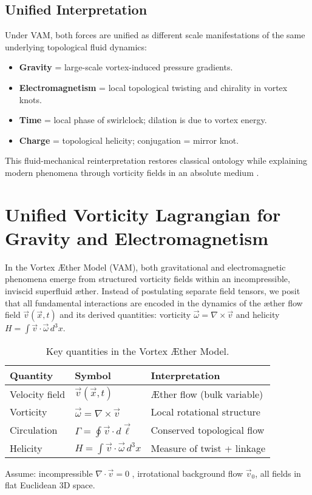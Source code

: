 \subsection{Unified Interpretation}

Under VAM, both forces are unified as different scale manifestations of the same underlying topological fluid dynamics:
\begin{itemize}
  \item \textbf{Gravity} = large-scale vortex-induced pressure gradients.
  \item \textbf{Electromagnetism} = local topological twisting and chirality in vortex knots.
  \item \textbf{Time} = local phase of swirlclock; dilation is due to vortex energy.
  \item \textbf{Charge} = topological helicity; conjugation = mirror knot.
\end{itemize}

This fluid-mechanical reinterpretation restores classical ontology while explaining modern phenomena through vorticity fields in an absolute medium \cite{Iskandarani2025SwirlClocks}.

\section{Unified Vorticity Lagrangian for Gravity and Electromagnetism}

In the Vortex \AE{}ther Model (VAM), both gravitational and electromagnetic phenomena emerge from structured vorticity fields within an incompressible, inviscid superfluid \ae{}ther. Instead of postulating separate field tensors, we posit that all fundamental interactions are encoded in the dynamics of the \ae{}ther flow field $\vec{v}(\vec{x}, t)$ and its derived quantities: vorticity $\vec{\omega} = \nabla \times \vec{v}$ and helicity $H = \int \vec{v} \cdot \vec{\omega} \, d^3x$.

\begin{table}[H]
\centering
\begin{tabular}{|l|l|l|}
\hline
\textbf{Quantity} & \textbf{Symbol} & \textbf{Interpretation} \\
\hline
Velocity field & $\vec{v}(\vec{x}, t)$ & Æther flow (bulk variable) \\
Vorticity & $\vec{\omega} = \nabla \times \vec{v}$ & Local rotational structure \\
Circulation & $\Gamma = \oint \vec{v} \cdot d\vec{\ell}$ & Conserved topological flow \\
Helicity & $H = \int \vec{v} \cdot \vec{\omega} \, d^3x$ & Measure of twist + linkage \\
\hline
\end{tabular}
\caption{Key quantities in the Vortex Æther Model.}
\end{table}
Assume: incompressible $\nabla \cdot \vec{v} = 0$ , irrotational background flow $\vec{v}_0$, all fields in flat Euclidean 3D space.

